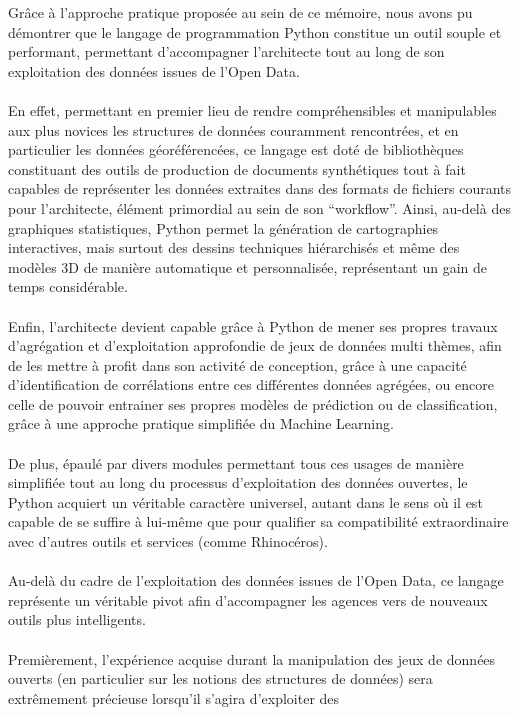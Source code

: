 \documentclass[
  11pt,
  french,
]{article}
\begin{document}
Grâce à l'approche pratique proposée au sein de ce mémoire, nous avons
pu démontrer que le langage de programmation Python constitue un outil
souple et performant, permettant d'accompagner l'architecte tout au long
de son exploitation des données issues de l'Open Data.\\
~\\
En effet, permettant en premier lieu de rendre compréhensibles et
manipulables aux plus novices les structures de données couramment
rencontrées, et en particulier les données géoréférencées, ce langage
est doté de bibliothèques constituant des outils de production de
documents synthétiques tout à fait capables de représenter les données
extraites dans des formats de fichiers courants pour l'architecte,
élément primordial au sein de son ``workflow''. Ainsi, au-delà des
graphiques statistiques, Python permet la génération de cartographies
interactives, mais surtout des dessins techniques hiérarchisés et même
des modèles 3D de manière automatique et personnalisée, représentant un
gain de temps considérable.\\
~\\
Enfin, l'architecte devient capable grâce à Python de mener ses propres
travaux d'agrégation et d'exploitation approfondie de jeux de données
multi thèmes, afin de les mettre à profit dans son activité de
conception, grâce à une capacité d'identification de corrélations entre
ces différentes données agrégées, ou encore celle de pouvoir entrainer
ses propres modèles de prédiction ou de classification, grâce à une
approche pratique simplifiée du Machine Learning.\\
~\\
De plus, épaulé par divers modules permettant tous ces usages de manière
simplifiée tout au long du processus d'exploitation des données
ouvertes, le Python acquiert un véritable caractère universel, autant
dans le sens où il est capable de se suffire à lui-même que pour
qualifier sa compatibilité extraordinaire avec d'autres outils et
services (comme Rhinocéros).\\
~\\
Au-delà du cadre de l'exploitation des données issues de l'Open Data, ce
langage représente un véritable pivot afin d'accompagner les agences
vers de nouveaux outils plus intelligents.\\
~\\
Premièrement, l'expérience acquise durant la manipulation des jeux de
données ouverts (en particulier sur les notions des structures de
données) sera extrêmement précieuse lorsqu'il s'agira d'exploiter des
\end{document}
